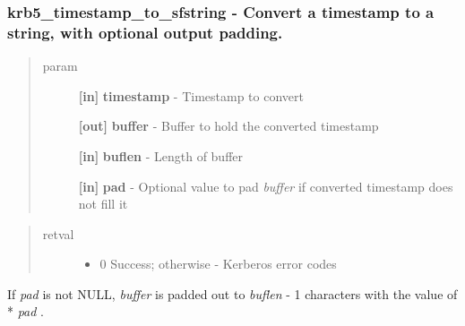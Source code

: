 \documentclass[letterpaper,10pt,english]{sphinxmanual}
\begin{document}
\subsubsection{krb5\_timestamp\_to\_sfstring -  Convert a timestamp to a string, with optional output padding.}
\label{appdev/refs/api/krb5_timestamp_to_sfstring:krb5-timestamp-to-sfstring-convert-a-timestamp-to-a-string-with-optional-output-padding}\label{appdev/refs/api/krb5_timestamp_to_sfstring::doc}

\begin{fulllineitems}
\label{appdev/refs/api/krb5_timestamp_to_sfstring:krb5_timestamp_to_sfstring}
\end{fulllineitems}

\begin{quote}\begin{description}
\item[{param}] \leavevmode
\textbf{{[}in{]}} \textbf{timestamp} - Timestamp to convert

\textbf{{[}out{]}} \textbf{buffer} - Buffer to hold the converted timestamp

\textbf{{[}in{]}} \textbf{buflen} - Length of buffer

\textbf{{[}in{]}} \textbf{pad} - Optional value to pad \emph{buffer} if converted timestamp does not fill it

\end{description}\end{quote}
\begin{quote}\begin{description}
\item[{retval}] \leavevmode\begin{itemize}
\item {} 
0   Success; otherwise - Kerberos error codes

\end{itemize}

\end{description}\end{quote}

If \emph{pad} is not NULL, \emph{buffer} is padded out to \emph{buflen} - 1 characters with the value of * \emph{pad} .
\end{document}
